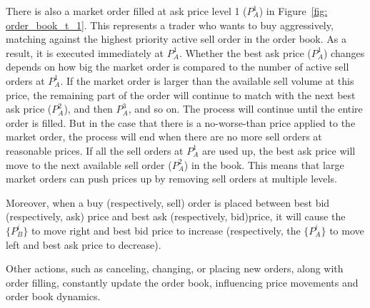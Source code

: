 There is also a market order filled at ask price level 1 ($P_A^1$) in Figure~\ref{fig: order_book_t_1}. This represents a trader who wants to buy aggressively, matching against the highest priority active sell order in the order book. As a result, it is executed immediately at $P_A^1$. Whether the best ask price ($P_A^1$) changes depends on how big the market order is compared to the number of active sell orders at $P_A^1$. If the market order is larger than the available sell volume at this price, the remaining part of the order will continue to match with the next best ask price ($P_A^2$), and then $P_A^3$, and so on. The process will continue until the entire order is filled. But in the case that there is a no-worse-than price applied to the market order, the process will end when there are no more sell orders at reasonable prices. If all the sell orders at $P_A^1$ are used up, the best ask price will move to the next available sell order ($P_A^2$) in the book. This means that large market orders can push prices up by removing sell orders at multiple levels.

Moreover, when a buy (respectively, sell) order is placed between best bid (respectively, ask) price and best ask (respectively, bid)price, it will cause the $\{P_B ^ {i}\}$ to move right and best bid price to increase (respectively, the $\{P_A ^ {i}\}$ to move left and best ask price to decrease). 

Other actions, such as canceling, changing, or placing new orders, along with order filling, constantly update the order book, influencing price movements and order book dynamics.

